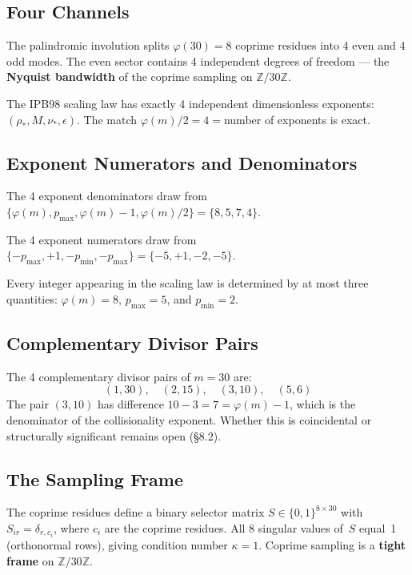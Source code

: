 \documentclass[11pt,letterpaper]{article}
\theoremstyle{definition}
\begin{document}
\subsection{Four Channels}

The palindromic involution splits $\varphi(30) = 8$ coprime residues into 4 even and 4 odd modes. The even sector contains 4 independent degrees of freedom --- the \textbf{Nyquist bandwidth} of the coprime sampling on $\mathbb{Z}/30\mathbb{Z}$.

The IPB98 scaling law has exactly 4 independent dimensionless exponents: $(\rho_*, M, \nu_*, \epsilon)$. The match $\varphi(m)/2 = 4 = {}$number of exponents is exact.

\subsection{Exponent Numerators and Denominators}

The 4 exponent denominators draw from $\{\varphi(m), p_{\text{max}}, \varphi(m) - 1, \varphi(m)/2\} = \{8, 5, 7, 4\}$.

The 4 exponent numerators draw from $\{-p_{\text{max}}, +1, -p_{\text{min}}, -p_{\text{max}}\} = \{-5, +1, -2, -5\}$.

Every integer appearing in the scaling law is determined by at most three quantities: $\varphi(m) = 8$, $p_{\text{max}} = 5$, and $p_{\text{min}} = 2$.

\subsection{Complementary Divisor Pairs}

The 4 complementary divisor pairs of $m = 30$ are:
\[
(1, 30), \quad (2, 15), \quad (3, 10), \quad (5, 6)
\]
The pair $(3, 10)$ has difference $10 - 3 = 7 = \varphi(m) - 1$, which is the denominator of the collisionality exponent. Whether this is coincidental or structurally significant remains open (\S8.2).

\subsection{The Sampling Frame}

The coprime residues define a binary selector matrix $S \in \{0,1\}^{8 \times 30}$ with $S_{ir} = \delta_{r, c_i}$, where $c_i$ are the coprime residues. All 8 singular values of~$S$ equal~1 (orthonormal rows), giving condition number $\kappa = 1$. Coprime sampling is a \textbf{tight frame} on $\mathbb{Z}/30\mathbb{Z}$.
\end{document}
